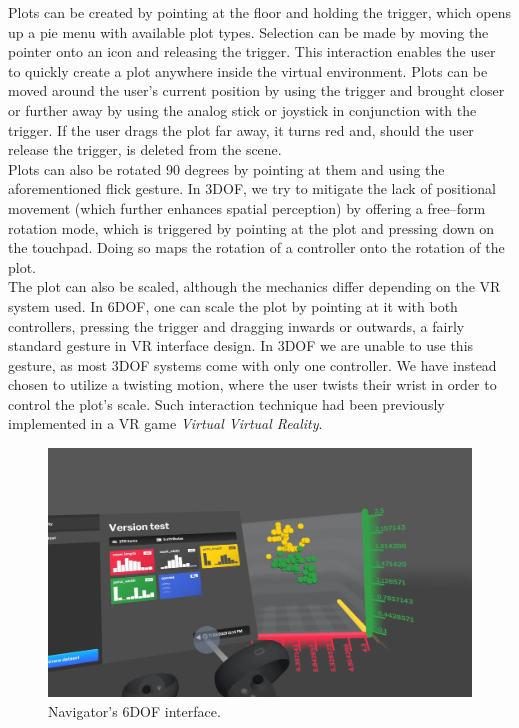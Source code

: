 \documentclass{article}
\begin{document}
Plots can be created by pointing at the floor and holding the trigger, which opens up a pie menu with available plot types. Selection can be made by moving the pointer onto an icon and releasing the trigger. This interaction enables the user to quickly create a plot anywhere inside the virtual environment. Plots can be moved around the user's current position by using the trigger and brought closer or further away by using the analog stick or joystick in conjunction with the trigger. If the user drags the plot far away, it turns red and, should the user release the trigger, is deleted from the scene.\\

Plots can also be rotated 90 degrees by pointing at them and using the aforementioned flick gesture. In 3DOF, we try to mitigate the lack of positional movement (which further enhances spatial perception) by offering a free--form rotation mode, which is triggered by pointing at the plot and pressing down on the touchpad. Doing so maps the rotation of a controller onto the rotation of the plot.\\

The plot can also be scaled, although the mechanics differ depending on the VR system used. In 6DOF, one can scale the plot by pointing at it with both controllers, pressing the trigger and dragging inwards or outwards, a fairly standard gesture in VR interface design. In 3DOF we are unable to use this gesture, as most 3DOF systems come with only one controller. We have instead chosen to utilize a twisting motion, where the user twists their wrist in order to control the plot's scale. Such interaction technique had been previously implemented in a VR game \emph{Virtual Virtual Reality}.\cite{vvr}\\

\begin{figure}[!h]
\centering
\includegraphics[scale=0.21]{images/cyberplot_6dof.png}
\caption{Navigator's 6DOF interface.}
\label{fig:navigator6dof}
\end{figure}
\end{document}
